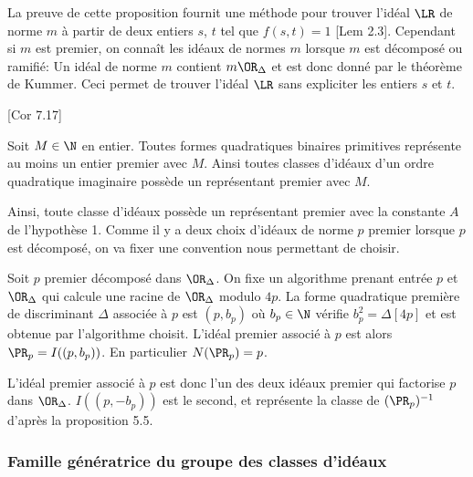 \begin{Rem}
	La preuve de cette proposition fournit une méthode pour trouver l'idéal $\LR$ de norme $m$ à partir de deux entiers $s$, $t$ tel que $f(s,t) = 1$ \cite{Cox}[Lem 2.3]. Cependant si $m$ est premier, on connaît les idéaux de normes $m$ lorsque $m$ est décomposé ou ramifié: Un idéal de norme $m$ contient $m\OR_{\Delta}$ et est donc donné par le théorème de Kummer. Ceci permet de trouver l'idéal $\LR$ sans expliciter les entiers $s$ et $t$.
\end{Rem}

\begin{Prop}\cite{Cox}[Cor 7.17]
	
	Soit $M\in\N$ en entier. Toutes formes quadratiques binaires primitives représente au moins un entier premier avec $M$. Ainsi toutes classes d'idéaux d'un ordre quadratique imaginaire possède un représentant premier avec $M$. 
	
\end{Prop}

Ainsi, toute classe d'idéaux possède un représentant premier avec la constante $A$ de l'hypothèse 1. Comme il y a deux choix d'idéaux de norme $p$ premier lorsque $p$ est décomposé, on va fixer une convention nous permettant de choisir. 

\begin{Def}
	Soit $p$ premier décomposé dans $\OR_{\Delta}$. On fixe un algorithme prenant entrée $p$ et $\OR_{\Delta}$ qui calcule une racine de $\OR_{\Delta}$ modulo $4p$. La forme quadratique première de discriminant $\Delta$ associée à $p$ est $(p,b_{p})$ où $b_{p}\in\N$ vérifie $b_{p}^2 = \Delta [4p]$ et est obtenue par l’algorithme choisit. L'idéal premier associé à $p$ est alors $\PR_{p} = I((p,b_{p}))$. En particulier $N(\PR_{p}) = p$.
\end{Def}

\begin{Rem}
	L'idéal premier associé à $p$ est donc l'un des deux idéaux premier qui factorise $p$ dans $\OR_{\Delta}$. $I((p,-b_{p}))$ est le second, et représente la classe de $(\PR_{p})^{-1}$ d'après la proposition 5.5. 
\end{Rem}












\subsubsection{Famille génératrice du groupe des classes d'idéaux}




